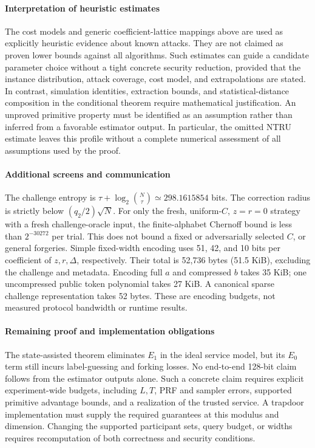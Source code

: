 \documentclass[lettersize,journal]{IEEEtran}
\begin{document}
\paragraph{Interpretation of heuristic estimates}
The cost models and generic coefficient-lattice mappings above are used
as explicitly heuristic evidence about known attacks. They are not
claimed as proven lower bounds against all algorithms. Such estimates
can guide a candidate parameter choice without a tight concrete security
reduction, provided that the instance distribution, attack coverage,
cost model, and extrapolations are stated. In contrast, simulation
identities, extraction bounds, and statistical-distance composition in
the conditional theorem require mathematical justification. An
unproved primitive property must be identified as an assumption rather
than inferred from a favorable estimator output. In particular, the
omitted NTRU estimate leaves this profile without a complete numerical
assessment of all assumptions used by the proof.

\paragraph{Additional screens and communication}
The challenge entropy is
$\tau+\log_2\binom N\tau\simeq298.1615854$ bits. The correction radius
is strictly below $(q_2/2)\sqrt N$. For only the fresh, uniform-$C$,
$z=r=0$ strategy with a fresh challenge-oracle input, the finite-alphabet Chernoff bound is
less than $2^{-30272}$ per trial. This does not bound a fixed or
adversarially selected $C$, or general forgeries.
Simple fixed-width encoding uses 51, 42, and 10 bits per coefficient
of $z,r,\Delta$, respectively. Their total is 52,736 bytes (51.5 KiB),
excluding the challenge and metadata. Encoding full $a$ and compressed
$b$ takes 35 KiB; one uncompressed public token polynomial takes 27 KiB.
A canonical sparse challenge representation takes 52 bytes. These are
encoding budgets, not measured protocol bandwidth or runtime results.

\paragraph{Remaining proof and implementation obligations}
The state-assisted theorem eliminates $E_1$ in the ideal service model,
but its $E_0$ term still incurs label-guessing and forking losses. No
end-to-end 128-bit claim follows from the estimator outputs alone. Such
a concrete claim requires explicit experiment-wide budgets, including
$L,T$, PRF and sampler errors, supported primitive advantage bounds,
and a realization of the trusted service. A trapdoor implementation must supply the required guarantees at
this modulus and dimension. Changing the supported participant sets,
query budget, or widths requires recomputation of both correctness and
security conditions.
\end{document}
